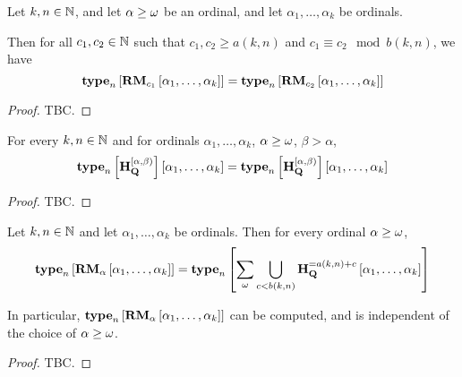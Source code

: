 \begin{corollary}\label{right-major-computable-many-ordinals}
    Let $k, n \in \mathbb{N}$, and let $\alpha \ge \omega$ be an ordinal,
    and let $\alpha_1, \ldots, \alpha_k$ be ordinals.

    Then for all $c_1, c_2 \in \mathbb{N}$ such that $c_1, c_2 \ge a(k, n)$ and $c_1 \equiv c_2 \mod b(k, n)$,
    we have
    \[
        \mathbf{type}_{n} \left[ {\mathbf{RM}_{c_1} \left[ {\alpha_1, \ldots, \alpha_k} \right]} \right]
        = \mathbf{type}_{n} \left[ {\mathbf{RM}_{c_2} \left[ {\alpha_1, \ldots, \alpha_k} \right]} \right]
    \]
\end{corollary}

\begin{proof}
    TBC.
\end{proof}

\begin{lemma}
    For every $k, n \in \mathbb{N}$ and for ordinals $\alpha_1, \ldots, \alpha_k$,
    $\alpha \ge \omega$, $\beta > \alpha$,
    \[
        \mathbf{type}_{n} \left[ {\mathbf{H}_{\mathbf{Q}}^{[\alpha, \beta)}} \right] \left[ {\alpha_1, \ldots, \alpha_k} \right]
        = \mathbf{type}_{n} \left[ {\mathbf{H}_{\mathbf{Q}}^{[\alpha, \beta)}} \right] \left[ {\alpha_1, \ldots, \alpha_k} \right]
    \]
\end{lemma}

\begin{proof}
    TBC.
\end{proof}

\begin{corollary}
    Let $k, n \in \mathbb{N}$ and let $\alpha_1, \ldots, \alpha_k$ be ordinals.
    Then for every ordinal $\alpha \ge \omega$,
    \[
        \mathbf{type}_{n} \left[ {\mathbf{RM}_{\alpha} \left[ {\alpha_1, \ldots, \alpha_k} \right]} \right]
        = \mathbf{type}_{n} \left[ {\sum_{\omega} \bigcup_{c < b(k, n)}{\mathbf{H}_{\mathbf{Q}}^{= a(k, n) + c}} \left[ {\alpha_1, \ldots, \alpha_k} \right]} \right]
    \]

    In particular, $\mathbf{type}_{n} \left[ {\mathbf{RM}_{\alpha} \left[ {\alpha_1, \ldots, \alpha_k} \right]} \right]$ can be computed,
    and is independent of the choice of $\alpha \ge \omega$.
\end{corollary}

\begin{proof}
    TBC.
\end{proof}